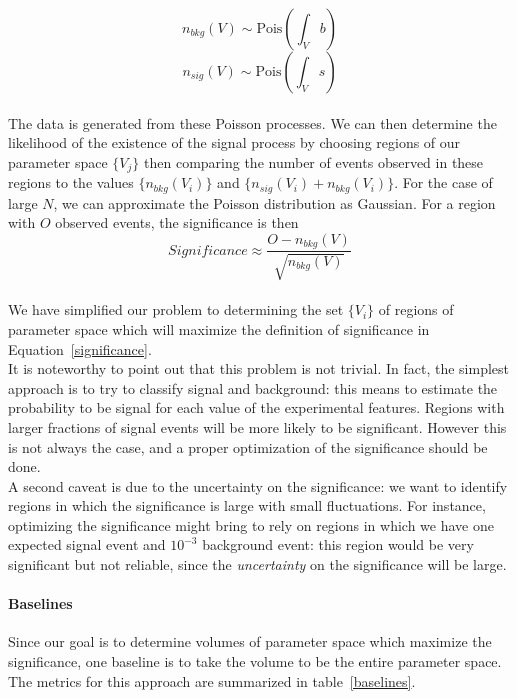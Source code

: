 \documentclass[11pt]{article}
\begin{document}
\[ n_{bkg}(V) \sim \text{Pois} \left( \int_V b \right)\]
\[n_{sig}(V) \sim \text{Pois} \left( \int_V s \right) \]

\paragraph{}
The data is generated from these Poisson processes. We can then determine the likelihood of the existence of the signal process by choosing regions of our parameter space $\{V_j\}$ then comparing the number of events observed in these regions to the values $\{n_{bkg}(V_i)\}$ and $\{n_{sig}(V_i) + n_{bkg}(V_i)\}$. For the case of large $N$, we can approximate the Poisson distribution as Gaussian. For a region with $O$ observed events, the significance is then
\begin{equation}
Significance \approx \frac{O-n_{bkg}(V)}{\sqrt{n_{bkg}(V)}}
\label{significance}
\end{equation}

\paragraph{}
We have simplified our problem to determining the set $\{V_i\}$ of regions of parameter space which will maximize the definition of significance in Equation~\ref{significance}.\\
It is noteworthy to point out that this problem is not trivial. In fact, the simplest approach is to try to classify signal and background: this means to estimate the probability to be signal for each value of the experimental features. Regions with larger fractions of signal events will be more likely to be significant. However this is not always the case, and a proper optimization of the significance should be done.\\
A second caveat is due to the uncertainty on the significance: we want to identify regions in which the significance is large with small fluctuations. For instance, optimizing the significance might bring to rely on regions in which we have one expected signal event and $10^{-3}$ background event: this region would be very significant but not reliable, since the \textit{uncertainty} on the significance will be large.

\paragraph{Baselines}
Since our goal is to determine volumes of parameter space which maximize the significance, one baseline is to take the volume to be the entire parameter space. The metrics for this approach are summarized in table~\ref{baselines}.
\end{document}
